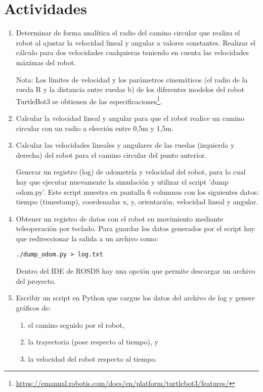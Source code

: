 \documentclass[tp]{lcc}
\begin{document}
\section{Actividades}
\begin{enumerate}
\item  Determinar de forma analítica el radio del camino circular que realiza el robot al ajustar la velocidad lineal y angular a valores constantes. Realizar el cálculo para dos velocidades cualquieras teniendo en cuenta las velocidades máximas del robot.

Nota: Los límites de velocidad y los parámetros cinemáticos (el radio de la rueda R y la distancia
entre ruedas b) de los diferentes modelos del robot TurtleBot3 se obtienen de las especificaciones\footnote{\url{https://emanual.robotis.com/docs/en/platform/turtlebot3/features/}}.

\item  Calcular la velocidad lineal y angular para que el robot realice un camino circular con un radio a
elección entre 0,5m y 1,5m.

\item  Calcular las velocidades lineales y angulares de las ruedas (izquierda y derecha) del robot para el camino circular del punto anterior.

Generar un registro (log) de odometría y velocidad del robot, para lo cual hay que ejecutar nuevamente
la simulación y utilizar el script ’dump odom.py’. Este script muestra en pantalla 6 columnas con los
siguientes datos: tiempo (timestamp), coordenadas x, y, orientación, velocidad lineal y angular.

\item Obtener un registro de datos con el robot en movimiento mediante teleoperación por teclado. Para
guardar los datos generados por el script hay que redireccionar la salida a un archivo como:

\begin{lstlisting}[style=bash] 
./dump_odom.py > log.txt
\end{lstlisting}

Dentro del IDE de ROSDS hay una opción que permite descargar un archivo del proyecto.

\item Escribir un script en Python que cargue los datos del archivo de log y genere gráficos de:
\begin{enumerate}
	\item el camino seguido por el robot,
	\item la trayectoria (pose respecto al tiempo), y
	\item la velocidad del robot respecto al tiempo.
\end{enumerate} 


\end{enumerate}
\end{document}
